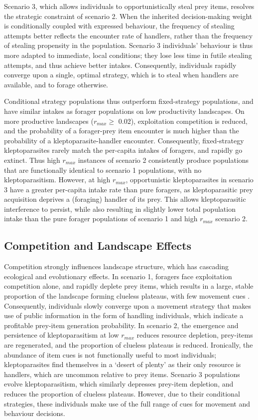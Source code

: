 \documentclass[11pt]{article}
\begin{document}
Scenario 3, which allows individuals to opportunistically steal prey items, resolves the strategic constraint of scenario 2.
When the inherited decision-making weight is conditionally coupled with expressed behaviour, the frequency of stealing attempts better reflects the encounter rate of handlers, rather than the frequency of stealing propensity in the population.
Scenario 3 individuals' behaviour is thus more adapted to immediate, local conditions; they lose less time in futile stealing attempts, and thus achieve better intakes.
Consequently, individuals rapidly converge upon a single, optimal strategy, which is to steal when handlers are available, and to forage otherwise.

Conditional strategy populations thus outperform fixed-strategy populations, and have similar intakes as forager populations on low productivity landscapes.
On more productive landscapes ($r_{max} \geq$ 0.02), exploitation competition is reduced, and the probability of a forager-prey item encounter is much higher than the probability of a kleptoparasite-handler encounter.
Consequently, fixed-strategy kleptoparasites rarely match the per-capita intakes of foragers, and rapidly go extinct.
Thus high $r_{max}$ instances of scenario 2 consistently produce populations that are functionally identical to scenario 1 populations, with no kleptoparasitism.
However, at high $r_{max}$, opportunistic kleptoparasites in scenario 3 have a greater per-capita intake rate than pure foragers, as kleptoparasitic prey acquisition deprives a (foraging) handler of its prey. 
This allows kleptoparasitic interference to persist, while also resulting in slightly lower total population intake than the pure forager populations of scenario 1 and high $r_{max}$ scenario 2.

\subsection{Competition and Landscape Effects}

Competition strongly influences landscape structure, which has cascading ecological and evolutionary effects.
In scenario 1, foragers face exploitation competition alone, and rapidly deplete prey items, which results in a large, stable proportion of the landscape forming clueless plateaus, with few movement cues \citep{perkins1992}.
Consequently, individuals slowly converge upon a movement strategy that makes use of public information in the form of handling individuals, which indicate a profitable prey-item generation probability.
In scenario 2, the emergence and persistence of kleptoparasitism at low $r_{max}$ reduces resource depletion, prey-items are regenerated, and the proportion of clueless plateaus is reduced.
Ironically, the abundance of item cues is not functionally useful to most individuals; kleptoparasites find themselves in a `desert of plenty' as their only resource is handlers, which are uncommon relative to prey items.
Scenario 3 populations evolve kleptoparasitism, which similarly depresses prey-item depletion, and reduces the proportion of clueless plateaus.
However, due to their conditional strategies, these individuals make use of the full range of cues for movement and behaviour decisions.
\end{document}
